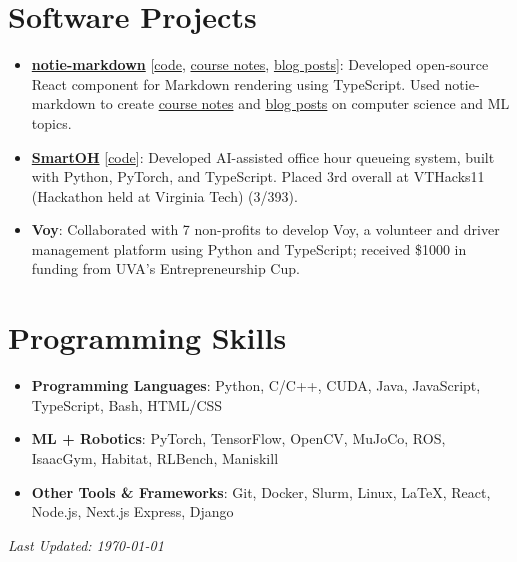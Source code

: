 \documentclass[letterpaper,11pt]{article}
\newcommand{\linkhref}[2]{\textcolor{linkblue}{\href{#1}{#2}}}
\begin{document}
\section{Software Projects}
\begin{itemize}[label={}, leftmargin=0pt]
  \item \textbf{\href{https://notie-markdown.vercel.app/}{notie-markdown}} [\linkhref{https://notie-markdown.vercel.app/}{code}, \linkhref{https://www.brandonyifanyang.com/notes}{course notes}, \linkhref{https://www.brandonyifanyang.com/blog}{blog posts}]: Developed open-source React component for Markdown rendering using TypeScript. Used notie-markdown to create \href{https://www.brandonyifanyang.com/notes}{course notes} and \href{https://www.brandonyifanyang.com/blog}{blog posts} on computer science and ML topics.
  \item \textbf{\href{https://github.com/ewei2406/SmartOH}{SmartOH}} [\linkhref{https://github.com/ewei2406/SmartOH}{code}]: Developed AI-assisted office hour queueing system, built with Python, PyTorch, and TypeScript. Placed 3rd overall at VTHacks11 (Hackathon held at Virginia Tech) (3/393).
  \item \textbf{Voy}: Collaborated with 7 non-profits to develop Voy, a volunteer and driver management platform using Python and TypeScript; received \$1000 in funding from UVA's Entrepreneurship Cup.
\end{itemize}

\section{Programming Skills}
\begin{itemize}[label={}, leftmargin=0pt]
  \item \textbf{Programming Languages}: Python, C/C++, CUDA, Java, JavaScript, TypeScript, Bash, HTML/CSS
  \item \textbf{ML + Robotics}: PyTorch, TensorFlow, OpenCV, MuJoCo, ROS, IsaacGym, Habitat, RLBench, Maniskill
  \item \textbf{Other Tools \& Frameworks}: Git, Docker, Slurm, Linux, \LaTeX, React, Node.js, Next.js Express, Django
\end{itemize}

\vfill
\noindent\textit{\small Last Updated: \today}
\end{document}
